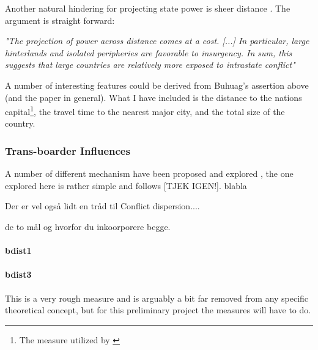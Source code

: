 \documentclass[a4paper]{article}
\begin{document}
Another natural hindering for projecting state power is sheer distance \citep{Fearon_2004, Buhaug_Gates_Lujala_2009, Cederman_Buhaug_Roed_2009, Buhaug_2010}. The argument is straight forward:

\begin{displayquote}

\emph{"The projection of power across distance comes at a cost. [...] In particular, large hinterlands and isolated peripheries are favorable to insurgency. In sum, this suggests that large countries are relatively more exposed to intrastate conflict"}\cite[113-114]{Buhaug_2010}

\end{displayquote}

A number of interesting features could be derived from Buhuag's assertion above (and the paper in general). What I have included is the distance to the nations capital\footnote{The measure utilized by \cite{Buhaug_2010}}, the travel time to the nearest major city, and the total size of the country\cite{prio_code_2015}.



\subsubsection{Trans-boarder Influences} %

A number of different mechanism have been proposed and explored \citep[29-30]{Blattman_Miguel_2010}, the one explored here is rather simple and follows \cite{Hegre_Sambanis_2006} [TJEK IGEN!]. blabla

Der er vel også lidt en tråd til Conflict dispersion....

de to mål og hvorfor du inkoorporere begge.

\paragraph{bdist1}  
\paragraph{bdist3}


This is a very rough measure and is arguably a bit far removed from any specific theoretical concept, but for this preliminary project the measures will have to do.
\end{document}
